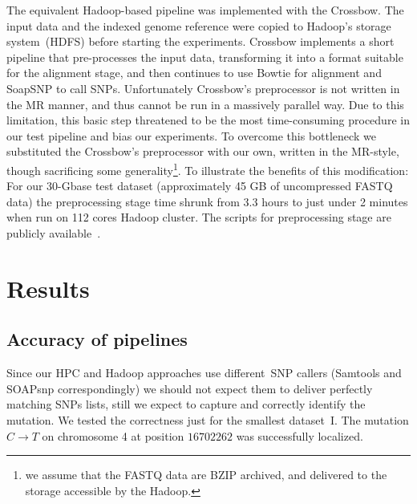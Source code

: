 \documentclass[11pt, oneside]{article}   	%
\begin{document}
The equivalent Hadoop-based pipeline was implemented with the Crossbow.  The input data and the indexed genome reference were copied to Hadoop’s storage system~(HDFS) before starting the experiments.  Crossbow implements a short pipeline that pre-processes the input data, transforming it into a format suitable for the alignment stage, and then continues to use Bowtie for alignment and SoapSNP to call SNPs.  Unfortunately Crossbow's preprocessor is not written  in the MR manner, and thus cannot be run in a massively parallel way. Due to this limitation, this basic step threatened to be the most time-consuming procedure in our test pipeline and bias our experiments. To overcome this bottleneck we substituted the Crossbow's preprocessor with our own, written in the MR-style, though sacrificing some generality\footnote{we assume that the FASTQ data are BZIP archived, and delivered to the storage accessible by the Hadoop.}. To illustrate the benefits of this modification: For our 30-Gbase test dataset (approximately 45 GB of uncompressed FASTQ data) the preprocessing stage time shrunk from 3.3 hours to just under 2 minutes when run on 112 cores Hadoop cluster. The scripts for preprocessing stage are publicly available~\cite{code_repo}.






\section{Results}
\label{sectionIII}

\subsection{Accuracy of pipelines}
Since our HPC and Hadoop approaches use different~SNP callers (Samtools and SOAPsnp correspondingly) we should not expect them to deliver perfectly matching SNPs lists, still we expect to capture and correctly identify the mutation. We tested the correctness just for the smallest dataset~I. The mutation $C\rightarrow T$ on chromosome 4 at position $16702262$ was successfully localized\cite{schneeberger}.
\end{document}
